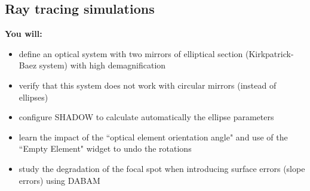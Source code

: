 \subsection{Ray tracing simulations}

\begin{youwillbox}
\textbf{You will:}

\begin{itemize}
    \item define an optical system with two mirrors of elliptical section (Kirkpatrick-Baez system) with high demagnification
    \item verify that this system does not work with circular mirrors (instead of ellipses)
    \item configure SHADOW to calculate automatically the ellipse parameters
    \item learn the impact of the ``optical element orientation angle" and use of the ``Empty Element" widget to undo the rotations
    \item study the degradation of the focal spot when introducing surface errors (slope errors) using DABAM
\end{itemize}
\end{youwillbox}

